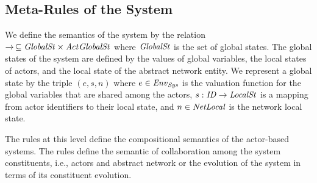 \subsection{Meta-Rules of the System}
We define the semantics of the system by the relation $\overto{}\,\subseteq \gstate\times\Act \gstate $ where $\mathit{GlobalSt}$ is the set of global states. The global states of the system are defined by the values of global variables, the local states of actors, and the local state of the abstract network entity. We represent a global state by the triple $(e,s,n)$ where $e\in\mathit{Env}_{\it Sys}$ is the valuation function for the global variables that are shared among the actors, $s: \mathit{ID}\rightarrow \mathit{LocalSt}$ is a mapping from actor identifiers to their local state, and $n\in {\it NetLocal}$ is the network local state. %

The rules at this level define the compositional semantics of the actor-based systems. The rules define the semantic of collaboration among the system constituents, i.e., actors and abstract network or the evolution of the system in terms of its constituent evolution.  


